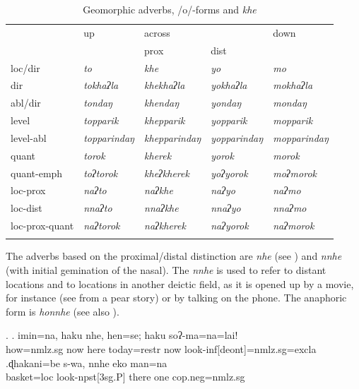  \begin{table}[htp]
\begin{centering}
\begin{tabular}{lllll}
\lsptoprule
									&{\sc up}		&\multicolumn{2}{l}{{\sc across}}&{\sc down}\\
											&				&{\sc prox}&{\sc dist}&\\
\midrule 	  
			{\sc loc/dir}	&\emph{to}&\emph{khe}&\emph{yo}&\emph{mo}\\
			{\sc dir} 				&\emph{tokhaʔla}&\emph{khekhaʔla}&\emph{yokhaʔla}&\emph{mokhaʔla}\\
			{\sc abl/dir}											&\emph{tondaŋ}&\emph{khendaŋ}&\emph{yondaŋ}&\emph{mondaŋ}\\
			{\sc level}											&\emph{topparik}&\emph{khepparik}&\emph{yopparik}&\emph{mopparik}\\
			{\sc level-abl}									&\emph{topparindaŋ}&\emph{khepparindaŋ}&\emph{yopparindaŋ}&\emph{mopparindaŋ}\\
			{\sc quant} 					&\emph{torok}&\emph{kherek}&\emph{yorok}&\emph{morok}\\
			{\sc quant-emph}								&\emph{toʔtorok}&\emph{kheʔkherek}&\emph{yoʔyorok}&\emph{moʔmorok}\\
			{\sc loc-prox}									&\emph{naʔto}&\emph{naʔkhe}&\emph{naʔyo}&\emph{naʔmo}\\
			{\sc loc-dist}										&\emph{nnaʔto}&\emph{nnaʔkhe}&\emph{nnaʔyo}&\emph{nnaʔmo}\\
			{\sc loc-prox-quant}					&\emph{naʔtorok}&\emph{naʔkherek}&\emph{naʔyorok}&\emph{naʔmorok}\\
\lspbottomrule
\end{tabular} 
\caption{Geomorphic adverbs, /o/-forms and \emph{khe}}\label{deic-all2}
\end{centering}
\end{table}


The adverbs based on the proximal/distal distinction are \emph{nhe}  (see \Next[a]) and \emph{nnhe}  (with initial gemination of the nasal). The  \emph{nnhe} is used to refer to distant locations and to locations in another deictic field, as it is opened up by a movie, for instance  (see \Next[b] from a pear story) or by talking on the phone. The anaphoric form is \emph{honnhe}  (see also ). 

\ex. \ag. imin=na,       haku nhe, hen=se;         haku soʔ-ma=na=lai!\\
how{\sc =nmlz.sg}  now here today{\sc =restr} now look{\sc -inf[deont]=nmlz.sg=excla}\\
  
\bg.ɖhakani=be    s-wa,         nnhe  eko man=na \\
basket{\sc =loc} look{\sc -npst[3sg.P]} there one {\sc cop.neg=nmlz.sg}\\
 


